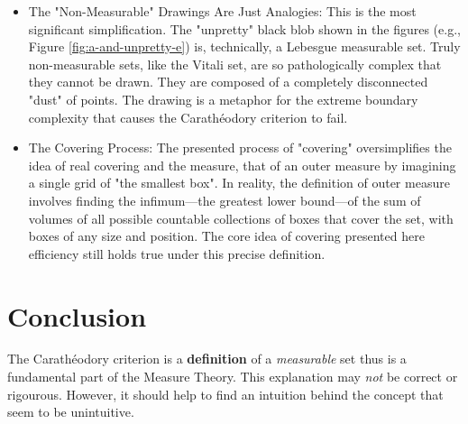 \documentclass[a4paper]{article}
\begin{document}
\begin{itemize}
    \item 
        The "Non-Measurable" Drawings Are Just Analogies: This is the most significant
        simplification. The "unpretty" black blob shown in the figures (e.g., Figure \ref{fig:a-and-unpretty-e})
        is, technically, a Lebesgue measurable set.  Truly non-measurable sets, like
        the Vitali set, are so pathologically complex that they cannot be drawn. They
        are composed of a completely disconnected "dust" of points. The drawing is a
        metaphor for the extreme boundary complexity that causes the Carathéodory
        criterion to fail.
    \item 
        The Covering Process: The presented process of "covering" oversimplifies the
        idea of real covering and the measure, that of an outer measure by
        imagining a single grid of "the smallest box". In reality, the definition of
        outer measure involves finding the infimum—the greatest lower bound—of the sum
        of volumes of all possible countable collections of boxes that cover the set,
        with boxes of any size and position. The core idea of covering presented here
        efficiency still holds true under this precise definition.
\end{itemize}




\section{Conclusion}%
\label{sec:Conclusion}
The Carathéodory criterion is a \textbf{definition} of a \textit{measurable}
set thus is a fundamental part of the Measure Theory. This explanation may
\textit{not} be correct or rigourous. However, it should help to find an
intuition behind the concept that seem to be unintuitive.
\end{document}

